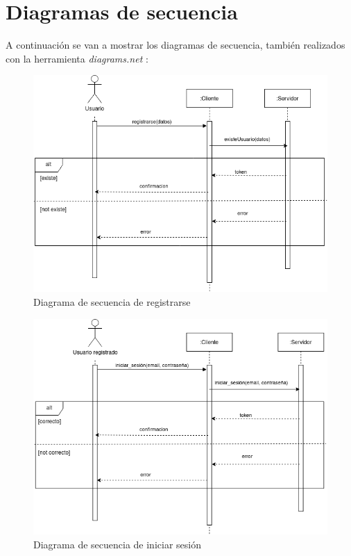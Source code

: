 \newpage
\section{Diagramas de secuencia}
A continuación se van a mostrar los diagramas de secuencia, también realizados
con la herramienta \textit{diagrams.net} \cite{diagramsnet}:

\begin{figure}[H]
    \centering
    \includegraphics[width=\textwidth]{diagramas/secuencia_registrarse.png}
    \caption{Diagrama de secuencia de registrarse}
    \label{fig:registrarse}
\end{figure}

\begin{figure}[H]
    \centering
    \includegraphics[width=\textwidth]{diagramas/secuencia_iniciar_sesion.png}
    \caption{Diagrama de secuencia de iniciar sesión}
    \label{fig:iniciar_sesion}
\end{figure}

